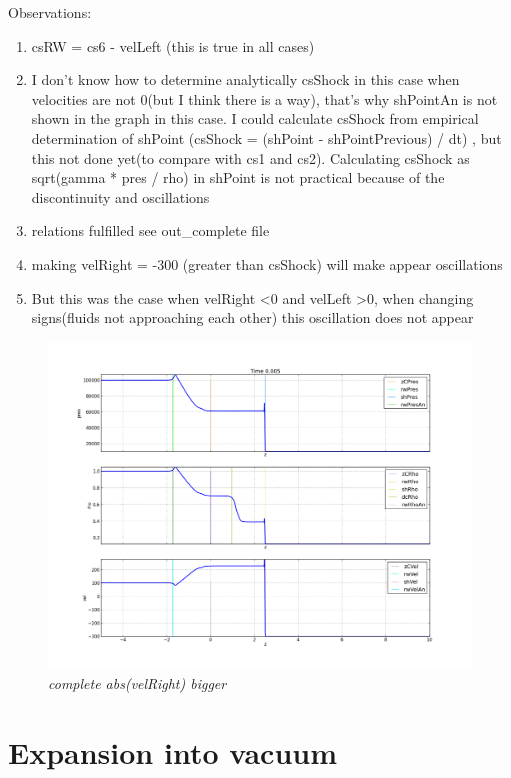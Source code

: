 \documentclass[12pt]{book}
\begin{document}
Observations:
\begin{enumerate}
\item csRW = cs6 - velLeft (this is true in all cases)
\item I don't know how to determine analytically csShock in this case when velocities are not 0(but I think there is a way), that's why shPointAn is not shown in the graph in this case. I could calculate csShock from empirical determination of shPoint (csShock = (shPoint - shPointPrevious) / dt) , but this not done yet(to compare with cs1 and cs2). Calculating csShock as sqrt(gamma * pres / rho) in shPoint is not practical because of the discontinuity and oscillations
\item relations fulfilled see out\_complete file
\item making velRight = -300 (greater than csShock) will make appear oscillations
\item But this was the case when velRight \textless 0 and velLeft \textgreater 0, when changing signs(fluids not approaching each other) this oscillation does not appear
\end{enumerate}



\begin{figure}[!h]
 \centering
 \includegraphics[scale=0.4]{complete300.png}
	\caption{\emph{complete abs(velRight) bigger}}
 \label{Fig: 1}
\end{figure}


\section*{Expansion into vacuum}
\end{document}
